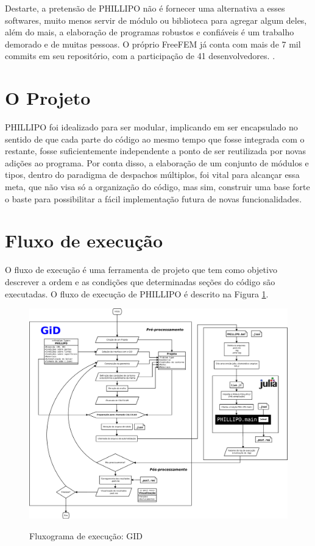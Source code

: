 Destarte, a pretensão de PHILLIPO não é fornecer uma alternativa a esses softwares, muito menos servir de módulo ou biblioteca para agregar algum deles, além do mais, a elaboração de programas robustos e confiáveis é um trabalho demorado e de muitas pessoas. O próprio FreeFEM já conta com mais de 7 mil commits em seu repositório, com a participação de 41 desenvolvedores. \cite{Hecht}. 

\section{O Projeto}

PHILLIPO foi idealizado para ser modular, implicando em ser encapsulado no sentido de que cada parte do código ao mesmo tempo que fosse integrada com o restante, fosse suficientemente independente a ponto de ser reutilizada por novas adições ao programa. Por conta disso, a elaboração de um conjunto de módulos e tipos, dentro do paradigma de despachos múltiplos, foi vital para alcançar essa meta, que não visa só a organização do código, mas sim, construir uma base forte o baste para possibilitar a fácil implementação futura de novas funcionalidades.

\section{Fluxo de execução}

O fluxo de execução é uma ferramenta de projeto que tem como objetivo descrever a ordem e as condições que determinadas seções do código são executadas. O fluxo de execução de PHILLIPO é descrito na Figura \ref{fig:fluxograma_GID}.



\begin{figure}
    \centering
    \caption{Fluxograma de execução: GID}
    \includegraphics[width = \textwidth]{Figuras/fluxograma_GID.pdf}
    \label{fig:fluxograma_GID}
\end{figure}